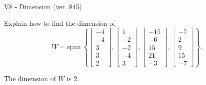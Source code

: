 \begin{exercise}
  \begin{exerciseTitle}V8 - Dimension (ver. 845)\end{exerciseTitle}
  \begin{exerciseStatement}
    Explain how to find the dimension of 
\[W=\mathrm{span}\ \left\{\left[\begin{array}{r}
-4 \\
-4 \\
3 \\
3 \\
2
\end{array}\right] , \left[\begin{array}{r}
1 \\
-2 \\
-2 \\
-4 \\
3
\end{array}\right] , \left[\begin{array}{r}
-15 \\
-6 \\
15 \\
21 \\
-3
\end{array}\right] , \left[\begin{array}{r}
-7 \\
2 \\
9 \\
15 \\
-7
\end{array}\right]\right\}.\]



  \end{exerciseStatement}
  \begin{exerciseAnswer}
   The dimension of \(W\) is  \(2\).
  


  \end{exerciseAnswer}
\end{exercise}